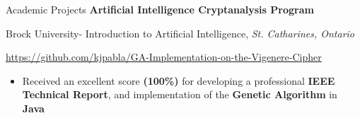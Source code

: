 \begin{rubric}{Academic Projects}
\entry*[November 2019] \textbf{Artificial Intelligence Cryptanalysis Program}
\par{Brock University- Introduction to Artificial Intelligence, \emph{St. Catharines, Ontario}}
%
\par{\faGithub}{  \url{https://github.com/kjpabla/GA-Implementation-on-the-Vigenere-Cipher}}
\begin{itemize}\vspace{-2mm}
 \item Received an excellent score \textbf{(100\%)} for developing a professional \textbf{IEEE Technical Report}, and implementation of the \textbf{Genetic Algorithm} in \textbf{Java}
\end{itemize}
\end{rubric}